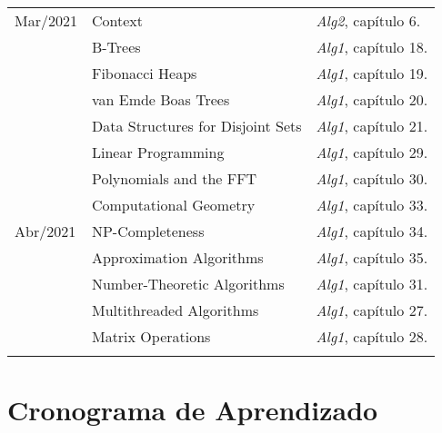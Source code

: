 \documentclass[a4paper]{inzane_syllabus} %
\begin{document}
\begin{center}
\begin{tabularx}{\textwidth}{p{2cm}p{8cm}p{9.5cm}}
\arrayrulecolor{maingray}\hline
Mar/2021 & Context                            & \emph{Alg2}, capítulo 6.  \\
         & B-Trees                            & \emph{Alg1}, capítulo 18. \\
         & Fibonacci Heaps                    & \emph{Alg1}, capítulo 19. \\
         & van Emde Boas Trees                & \emph{Alg1}, capítulo 20. \\
         & Data Structures for Disjoint Sets  & \emph{Alg1}, capítulo 21. \\
         & Linear Programming                 & \emph{Alg1}, capítulo 29. \\
         & Polynomials and the FFT            & \emph{Alg1}, capítulo 30. \\
         & Computational Geometry             & \emph{Alg1}, capítulo 33. \\

\arrayrulecolor{maingray}\hline
Abr/2021 & NP-Completeness              & \emph{Alg1}, capítulo 34.  \\
         & Approximation Algorithms     & \emph{Alg1}, capítulo 35.  \\
         & Number-Theoretic Algorithms  & \emph{Alg1}, capítulo 31.  \\
         & Multithreaded Algorithms     & \emph{Alg1}, capítulo 27.  \\
         & Matrix Operations            & \emph{Alg1}, capítulo 28.  \\

\arrayrulecolor{myCOLOR}\hline
\end{tabularx}
\end{center}

\newpage
\section{Cronograma de Aprendizado}

\end{document}

